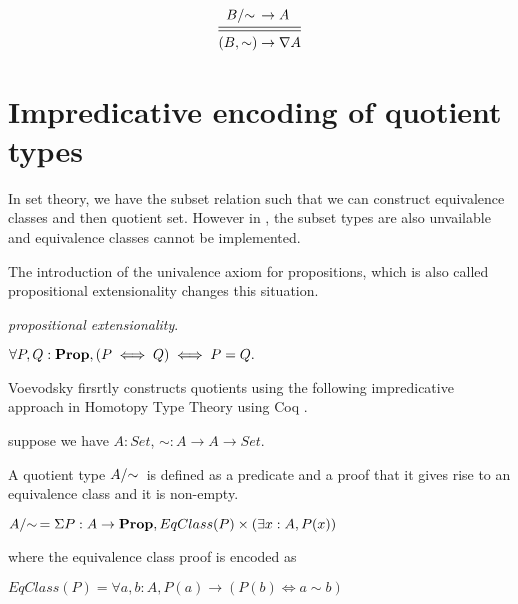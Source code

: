 \begin{equation*}
\begin{aligned}
\qset{B} & \rightarrow A\\
\midrule
\midrule
(B , \sim) & \rightarrow \nabla A\\
\end{aligned}
\end{equation*}


\section{Impredicative encoding of quotient types}

In set theory, we have the subset relation such that we can construct equivalence
classes and then quotient set. 
However in \itt, the subset types are also unvailable and equivalence
classes cannot be implemented.

The introduction of the univalence axiom for propositions, which is also
called propositional extensionality changes this situation.

\begin{definition}
\emph{propositional extensionality}.

$\forall P, Q : \operatorname{\mathbf{Prop}}, (P \iff Q) \iff P = Q.$

\end{definition}

Voevodsky
firsrtly constructs quotients using the following impredicative approach in Homotopy Type Theory using Coq
\cite{voe:hset}.





suppose we have $A : Set$, $\sim : A \rightarrow A \rightarrow Set$.

A quotient type $\qset{A}$ is defined as a predicate and a proof that
it gives rise to an equivalence class and it is non-empty.

$\qset{A} = \Sigma P : A \rightarrow \Prop, EqClass (P) \times (\exists x : A, P (x))$

where the equivalence class proof is encoded as

$EqClass (P) = \forall a, b : A, P(a) \rightarrow (P(b) \iff a \sim b)$

